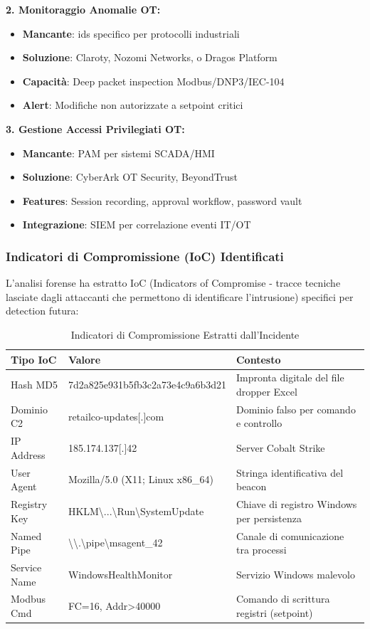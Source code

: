\textbf{2. Monitoraggio Anomalie OT:}
\begin{itemize}
    \item \textbf{Mancante}: \gls{ids} specifico per protocolli industriali
    \item \textbf{Soluzione}: Claroty, Nozomi Networks, o Dragos Platform
    \item \textbf{Capacità}: Deep packet inspection Modbus/DNP3/IEC-104
    \item \textbf{Alert}: Modifiche non autorizzate a setpoint critici
\end{itemize}

\textbf{3. Gestione Accessi Privilegiati OT:}
\begin{itemize}
    \item \textbf{Mancante}: PAM per sistemi SCADA/HMI
    \item \textbf{Soluzione}: CyberArk OT Security, BeyondTrust
    \item \textbf{Features}: Session recording, approval workflow, password vault
    \item \textbf{Integrazione}: SIEM per correlazione eventi IT/OT
\end{itemize}

\subsubsection{Indicatori di Compromissione (IoC) Identificati}

L'analisi forense ha estratto IoC (Indicators of Compromise - tracce tecniche lasciate dagli attaccanti che permettono di identificare l'intrusione) specifici per detection futura:

\begin{table}[htbp]
\centering
\caption{Indicatori di Compromissione Estratti dall'Incidente}
\label{tab:ioc_retailco}
\begin{tabular}{|l|l|p{5cm}|}
\hline
\textbf{Tipo IoC} & \textbf{Valore} & \textbf{Contesto} \\
\hline
Hash MD5 & 7d2a825e931b5fb3c2a73e4c9a6b3d21 & Impronta digitale del file dropper Excel \\
Dominio C2 & retailco-updates[.]com & Dominio falso per comando e controllo \\
IP Address & 185.174.137[.]42 & Server Cobalt Strike \\
User Agent & Mozilla/5.0 (X11; Linux x86\_64) & Stringa identificativa del beacon \\
Registry Key & HKLM\textbackslash{}...\textbackslash{}Run\textbackslash{}SystemUpdate & Chiave di registro Windows per persistenza \\
Named Pipe & \textbackslash{}\textbackslash{}.\textbackslash{}pipe\textbackslash{}msagent\_42 & Canale di comunicazione tra processi \\
Service Name & WindowsHealthMonitor & Servizio Windows malevolo \\
Modbus Cmd & FC=16, Addr>40000 & Comando di scrittura registri (setpoint) \\
\hline
\end{tabular}
\end{table}

